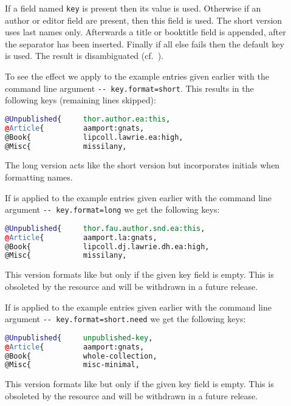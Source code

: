 \documentclass[11pt,a4paper]{scrbook}
\begin{document}
\begin{description}
\item []
  If a field named \verb|key| is present then its value is used. Otherwise if
  an author or editor field are present, then this field is used. The short
  version uses last names only. Afterwards a title or booktitle field is
  appended, after the  separator has been inserted.
  Finally if all else fails then the default key  is used.
  The result is disambiguated (cf.\ ).
  
  To see the effect we apply \BibTool{} to the example entries given earlier
  with the command line argument \verb|-- key.format=short|.  This results in
  the following keys (remaining lines skipped):
\begin{lstlisting}[language=BibTeX]
@Unpublished{     thor.author.ea:this,
@Article{         aamport:gnats,
@Book{            lipcoll.lawrie.ea:high,
@Misc{            missilany,
\end{lstlisting}

\item []
  The long version acts like the short version but incorporates initials when
  formatting names.
  
  If \BibTool{} is applied to the example entries given earlier with the
  command line argument \verb|-- key.format=long| we get the following keys:
\begin{lstlisting}[language=BibTeX]
@Unpublished{     thor.fau.author.snd.ea:this,
@Article{         aamport.la:gnats,
@Book{            lipcoll.dj.lawrie.dh.ea:high,
@Misc{            missilany,
\end{lstlisting}

\item []
  This version formats like  but only if the given key field is
  empty. This is obsoleted by the resource  and will be
  withdrawn in a future release.
  
  If \BibTool{} is applied to the example entries given earlier with the
  command line argument \verb|-- key.format=short.need| we get the following
  keys:
\begin{lstlisting}[language=BibTeX]
@Unpublished{     unpublished-key,
@Article{         aamport:gnats,
@Book{            whole-collection,
@Misc{            misc-minimal,
\end{lstlisting}
\item []
  This version formats like  but only if the given key field is
  empty. This is obsoleted by the resource  and will be
  withdrawn in a future release.
  

\end{description}
\end{document}
